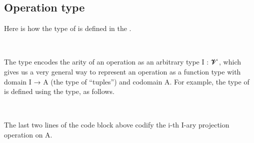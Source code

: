 \documentclass[a4paper,UKenglish,cleveref,autoref,thm-restate,11pt]{lipics-v2021}
\begin{document}
\subsection{Operation type}\label{sec:operation-type}
Here is how the type of  is defined in the \ualib.
\ccpad
\begin{code}%
\>[0]\AgdaSpace{}%
\AgdaSymbol{:}\AgdaSpace{}%
\AgdaSpace{}%
\AgdaSpace{}%
\AgdaSpace{}%
\AgdaSpace{}%
\AgdaSpace{}%
\AgdaSpace{}%
\AgdaSpace{}%
\AgdaSpace{}%
%
\<%
\\
%
\>[0]\AgdaSpace{}%
\AgdaSpace{}%
\AgdaSpace{}%
\AgdaSymbol{=}\AgdaSpace{}%
\AgdaSymbol{(}\AgdaSpace{}%
\AgdaSpace{}%
\AgdaSymbol{)}\AgdaSpace{}%
\AgdaSpace{}%
\end{code}
\ccpad
The type  encodes the arity of an operation as an arbitrary type \ab I : \ab 𝓥 ̇, which gives us a very general way to represent an operation as a function type with domain \ab I → \ab A (the type of ``tuples'') and codomain \ab A.  For example, the type of  is defined using the  type, as follows.
\ccpad
\begin{code}
\>[1]\AgdaSpace{}%
\AgdaSymbol{:}\AgdaSpace{}%
\AgdaSymbol{\{}\AgdaSpace{}%
\AgdaSymbol{:}\AgdaSpace{}%
\AgdaSpace{}%
\AgdaSpace{}%
\AgdaSymbol{\}}\AgdaSpace{}%
\AgdaSymbol{\{}\AgdaSpace{}%
\AgdaSymbol{:}\AgdaSpace{}%
\AgdaSpace{}%
\AgdaSpace{}%
\AgdaSymbol{\}}\AgdaSpace{}%
\AgdaSpace{}%
\AgdaSpace{}%
\AgdaSpace{}%
\AgdaSpace{}%
\AgdaSpace{}%
\<%
\\
%
\>[1]\AgdaSpace{}%
\AgdaSpace{}%
\AgdaSpace{}%
\AgdaSymbol{=}\AgdaSpace{}%
\AgdaSpace{}%
\<%
\end{code}
\ccpad
The last two lines of the code block above codify the \ab i-th \ab I-ary projection operation on \ab A.
\end{document}
